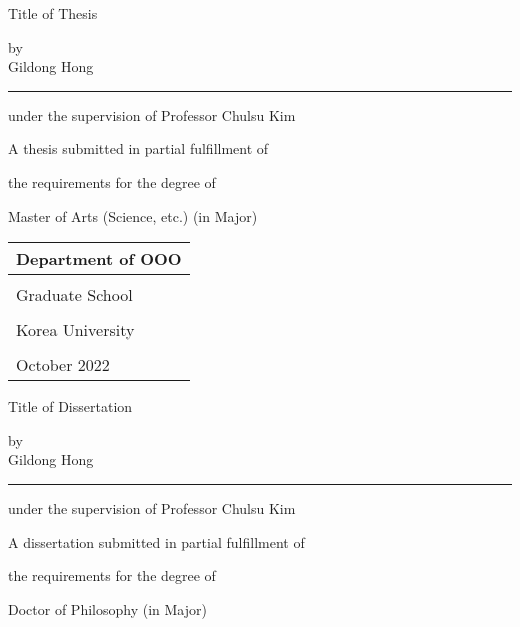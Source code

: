 \documentclass[11pt]{report}
\numberwithin{figure}{chapter}
\theoremstyle{plain}
\theoremstyle{definition}
\theoremstyle{corollary}
\theoremstyle{definition}
\theoremstyle{plain}
\theoremstyle{definition}
\theoremstyle{plain}
\begin{document}
\newpage
\begin{center}
\huge Title of Thesis
\par\vspace{50pt}
\Large by\\
Gildong Hong
\par\vspace{20pt}
\rule{.6\textwidth}{0.4pt}
\par\vspace{20pt}
under the supervision of Professor Chulsu Kim
\par\vspace{20pt}
A thesis submitted in partial fulfillment of \par
the requirements for the degree of \par
Master of Arts (Science, etc.) (in Major)
\par\vspace{10pt}
\end{center}
\noindent
\begin{tabularx}{\textwidth}{| >{\centering\arraybackslash}X |}
\arrayrulecolor{blue}
\hline
\Large Department of OOO \\\hline
\rule{0pt}{30pt}\\\hline
\LARGE Graduate School \\\hline
\\[-8pt]\hline
\LARGE Korea University \\\hline
\rule{0pt}{20pt}\\\hline
\large October 2022 \\\hline
\end{tabularx}

\newpage
\begin{center}
\huge Title of Dissertation
\par\vspace{50pt}
\Large by\\
Gildong Hong
\par\vspace{20pt}
\rule{.6\textwidth}{0.4pt}
\par\vspace{20pt}
under the supervision of Professor Chulsu Kim
\par\vspace{20pt}
A dissertation submitted in partial fulfillment of \par
the requirements for the degree of \par
Doctor of Philosophy (in Major)
\par\vspace{10pt}
\end{center}
\end{document}
